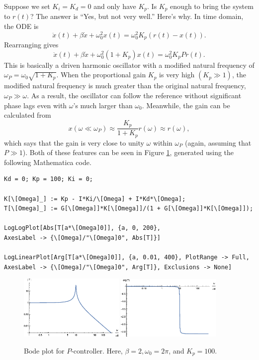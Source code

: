 \documentclass{article}
\theoremstyle{definition}
\newcommand{\f}[2]{\frac{#1}{#2}}
\begin{document}
Suppose we set $K_i = K_d = 0$ and only have $K_p$. Is $K_p$ enough to bring the system to $r(t)$? The answer is ``Yes, but not very well.'' Here's why. In time domain, the ODE is 
\begin{equation*}
\ddot{x}(t) + \beta \dot{x} + \omega_0^2 x(t) = \omega_0^2 K_p (r(t) - x(t)). 
\end{equation*} 
Rearranging gives
\begin{equation*}
\ddot{x}(t) + \beta \dot{x} + \omega_0^2 (1+K_p) x(t) = \omega_0^2 K_p P r(t). 
\end{equation*}
This is basically a driven harmonic oscillator with a modified natural frequency of $\omega_P = \omega_0 \sqrt{1+K_p}$. When the proportional gain $K_p$ is very high $(K_p \gg 1)$, the modified natural frequency is much greater than the original natural frequency, $\omega_P \gg \omega$. As a result, the oscillator can follow the reference without significant phase lags even with $\omega$'s much larger than $\omega_0$. Meanwhile, the gain can be calculated from  
\begin{equation*}
x(\omega\ll \omega_P) \approx \f{K_p}{1+K_p} r(\omega) \approx r(\omega),
\end{equation*}
which says that the gain is very close to unity $\omega$ within $\omega_P$ (again, assuming that $P\gg 1$). Both of these features can be seen in Figure \ref{fig:bode_3}, generated using the following Mathematica code.
\begin{lstlisting}
Kd = 0; Kp = 100; Ki = 0;

K[\[Omega]_] := Kp - I*Ki/\[Omega] + I*Kd*\[Omega]; 
T[\[Omega]_] := G[\[Omega]]*K[\[Omega]]/(1 + G[\[Omega]]*K[\[Omega]]);

LogLogPlot[Abs[T[a*\[Omega]0]], {a, 0, 200}, 
AxesLabel -> {\[Omega]/"\[Omega]0", Abs[T]}]

LogLinearPlot[Arg[T[a*\[Omega]0]], {a, 0.01, 400}, PlotRange -> Full, 
AxesLabel -> {\[Omega]/"\[Omega]0", Arg[T]}, Exclusions -> None]
\end{lstlisting}


\begin{figure}
	\centering
	\includegraphics[width=0.45\textwidth]{bode_5}
	\quad
	\includegraphics[width=0.45\textwidth]{bode_6}
	\caption{Bode plot for $P$-controller. Here, $\beta = 2,\omega_0 = 2\pi$, and $K_p = 100$.} %
	\label{fig:bode_3}
\end{figure}
\end{document}

